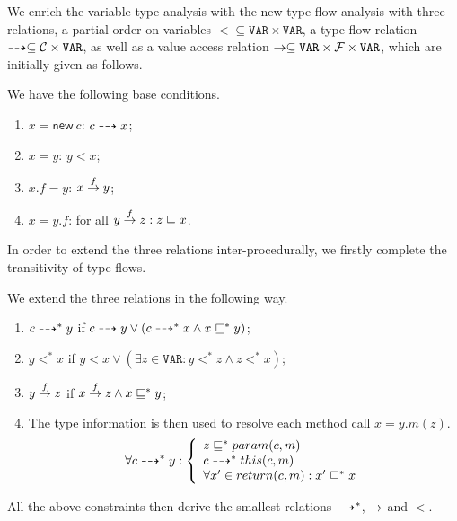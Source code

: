 \documentclass{llncs}
\newcommand{\keyword}[1]{\mathsf{#1}}
\newcommand{\kwnew}[0]{\keyword{new}}
\newcommand\Var{\mathtt{VAR}}
\begin{document}
We enrich the variable type analysis with the new type flow analysis with three relations,
a partial order on variables $\less\subseteq\Var\times\Var$, a type flow relation
$\tflow\subseteq\Class\times\Var$, as well as a value access relation $\hflow\subseteq\Var\times\Field\times\Var$,
which are initially given as follows.
\begin{definition}\label{def:base}
We have the following base conditions.
\begin{enumerate}
  \item $x = \kwnew\ c$: $c\dashrightarrow x$;
  \item $x = y $: $y\less x$;
  \item $x.f = y$: $x\stackrel{f}{\rightarrow}y$;
  \item $x = y.f $: for all $y\stackrel{f}{\rightarrow}z: z\sqsubseteq x$.
\end{enumerate}
\end{definition}
In order to extend the three relations inter-procedurally, we firstly complete the transitivity of type flows.
\begin{definition}\label{def:extension}
We extend the three relations in the following way.
\begin{enumerate}
  \item $c\dashrightarrow^* y$ if $c\dashrightarrow y\vee(c\dashrightarrow^* x\wedge x\sqsubseteq^* y)$;
  \item $y\less^* x$ if $y\less x\vee(\exists z\in\Var:y\less^* z\wedge z\less^* x)$;
  \item $y\stackrel{f}{\rightarrow}z$ if $x\stackrel{f}{\rightarrow}z\wedge x\sqsubseteq^* y$;
  \item The type information is then used to resolve each method call $x = y.m(z)$.
\begin{equation*}
  \forall c\dashrightarrow^* y:\left\{\begin{array}{l}
        z\sqsubseteq^* param(c,m)\\
        c\dashrightarrow^* this(c,m)\\
        \forall x'\in return(c,m): x'\sqsubseteq^* x \\
        \end{array}\right.
\end{equation*}
\end{enumerate}

All the above constraints then derive the smallest relations $\dashrightarrow^*$, $\rightarrow$ and $\less$.
\end{definition}
\end{document}

